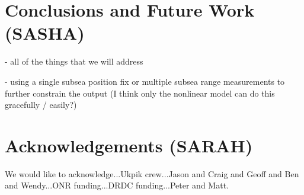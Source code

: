 \section{Conclusions and Future Work \textbf(SASHA)}

- all of the things that we will address

- using a single subsea position fix or multiple subsea range measurements to further constrain the output (I think only the nonlinear model can do this gracefully / easily?)


\section*{Acknowledgements \textbf(SARAH)}
We would like to acknowledge...Ukpik crew...Jason and Craig and Geoff and Ben and Wendy...ONR funding...DRDC funding...Peter and Matt.

